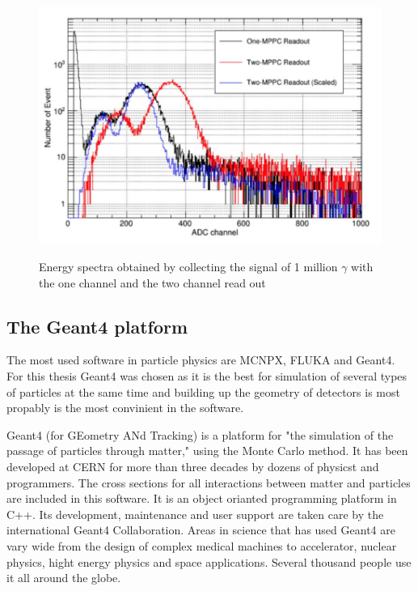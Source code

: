 \documentclass[12pt, a4paper,titlepage]{article}
\numberwithin{equation}{section}
\numberwithin{figure}{section}
\begin{document}
\begin{figure}[H]
\centering
\includegraphics[width=130.0mm]{images/histo_for_det.png}
\label{fig:spectras_meas}
\caption{Energy spectra obtained by collecting the signal of 1 million $\gamma$ with the one channel and the two channel read out}
\label{fig:spectra}
\end{figure}

\subsection{The Geant4 platform}

The most used software in particle physics are MCNPX, FLUKA and Geant4. For this thesis Geant4 was chosen as it is the best for simulation of several types of particles at the same time and building up the geometry of detectors is most propably is the most convinient in the software. 

Geant4 \cite{geant1, geant2, geant3} (for GEometry ANd Tracking) is a platform for "the simulation of the passage of particles through matter," using the Monte Carlo method. It has been developed at CERN for more than three decades by dozens of physicst and programmers. The cross sections for all interactions between matter and particles are included in this software. It is an object orianted programming platform in C++. Its development, maintenance and user support are taken care by the international Geant4 Collaboration. Areas in science that has used Geant4 are vary wide from the design of complex medical machines to accelerator, nuclear physics, hight energy physics and space applications. Several thousand people use it all around the globe.
\end{document}
